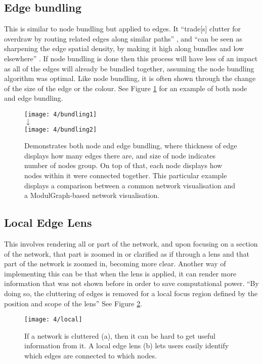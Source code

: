 \documentclass[../dissertation.tex]{subfiles}
\begin{document}
\subsection{Edge bundling}
\label{sec:edge_bundling}
This is similar to node bundling but applied to edges. It ``trade[s] clutter for overdraw by routing related edges along similar paths'' \cite{hurter2012graph}, and ``can be seen as sharpening the edge spatial density, by making it high along bundles and low elsewhere'' \cite{hurter2012graph}. If node bundling is done then this process will have less of an impact as all of the edges will already be bundled together, assuming the node bundling algorithm was optimal. Like node bundling, it is often shown through the change of the size of the edge or the colour. See Figure \ref{fig:bundling} for an example of both node and edge bundling.
\begin{figure}
    \centering
    \texttt{[image: 4/bundling1]}
    \\$\downarrow$\\
    \texttt{[image: 4/bundling2]}
    \caption{Demonstrates both node and edge bundling, where thickness of edge displays how many edges there are, and size of node indicates number of nodes group. On top of that, each node displays how nodes within it were connected together. This particular example displays a comparison between a common network visualisation and a ModulGraph-based network visualisation. \cite{li2015modulgraph}}
    \label{fig:bundling}
\end{figure}

\subsection{Local Edge Lens}
This involves rendering all or part of the network, and upon focusing on a section of the network, that part is zoomed in or clarified as if through a lens and that part of the network is zoomed in, becoming more clear. Another way of implementing this can be that when the lens is applied, it can render more information that was not shown before in order to save computational power. ``By doing so, the cluttering of edges is removed for a local focus region defined by the position and scope of the lens'' \cite{tominski2006fisheye} See Figure \ref{fig:local}.
\begin{figure}
    \centering
    \texttt{[image: 4/local]}
    \caption{If a network is cluttered (a), then it can be hard to get useful information from it. A local edge lens (b) lets users easily identify which edges are connected to which nodes. \cite{tominski2006fisheye}}
    \label{fig:local}
\end{figure}
\end{document}
